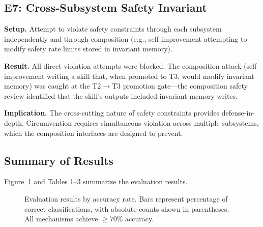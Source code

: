 \documentclass[11pt]{article}
\begin{document}
\subsection{E7: Cross-Subsystem Safety Invariant}

\textbf{Setup.} Attempt to violate safety constraints through each subsystem independently and through composition (e.g., self-improvement attempting to modify safety rate limits stored in invariant memory).

\textbf{Result.} All direct violation attempts were blocked. The composition attack (self-improvement writing a skill that, when promoted to T3, would modify invariant memory) was caught at the T2$\rightarrow$T3 promotion gate---the composition safety review identified that the skill's outputs included invariant memory writes.

\textbf{Implication.} The cross-cutting nature of safety constraints provides defense-in-depth. Circumvention requires simultaneous violation across multiple subsystems, which the composition interfaces are designed to prevent.

\subsection{Summary of Results}

Figure~\ref{fig:eval-summary} and Tables 1--3 summarize the evaluation results.

\begin{figure}[ht]
\centering
{}
\caption{Evaluation results by accuracy rate. Bars represent percentage of correct classifications, with absolute counts shown in parentheses. All mechanisms achieve $\geq$70\% accuracy.}
\label{fig:eval-summary}
\end{figure}
\end{document}
